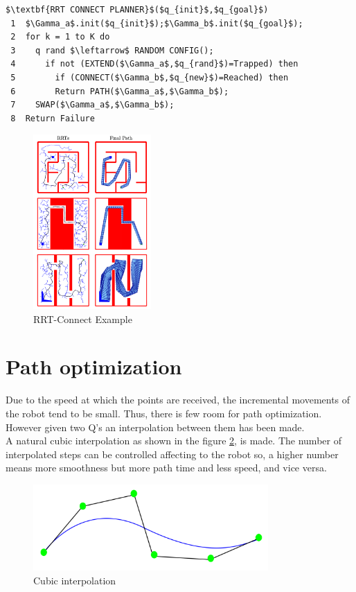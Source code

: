 \begin{lstlisting}[frame=tb, mathescape=true,xleftmargin=.13\textwidth, xrightmargin=.13\textwidth]
$\textbf{RRT CONNECT PLANNER}$($q_{init}$,$q_{goal}$)
 1  $\Gamma_a$.init($q_{init}$);$\Gamma_b$.init($q_{goal}$);
 2  for k = 1 to K do
 3    q rand $\leftarrow$ RANDOM CONFIG();
 4      if not (EXTEND($\Gamma_a$,$q_{rand}$)=Trapped) then
 5        if (CONNECT($\Gamma_b$,$q_{new}$)=Reached) then
 6        Return PATH($\Gamma_a$,$\Gamma_b$);
 7    SWAP($\Gamma_a$,$\Gamma_b$);
 8  Return Failure
\end{lstlisting}

\begin{figure}[!ht]
	\centering
	\includegraphics[width=0.4\textwidth]{figures/rrt_connect}
	\caption{RRT-Connect Example}
	\label{fig:rrt_connect}
\end{figure}

\section{Path optimization} %
\label{sec:path_optimization}
Due to the speed at which the points are received, the incremental movements of the robot tend to be small. Thus, there is few room for path optimization. However given two Q's an interpolation between them has been made.\\

A natural cubic interpolation as shown in the figure \ref{fig:cubic interpolation}, is made. The number of interpolated steps can be controlled affecting to the robot so, a higher number means more smoothness but more path time and less speed, and vice versa.

\begin{figure}[!hb]
	\centering
	\includegraphics[width=0.8\textwidth]{figures/cubic_interpolation}
	\caption{Cubic interpolation}
	\label{fig:cubic interpolation}
\end{figure}

